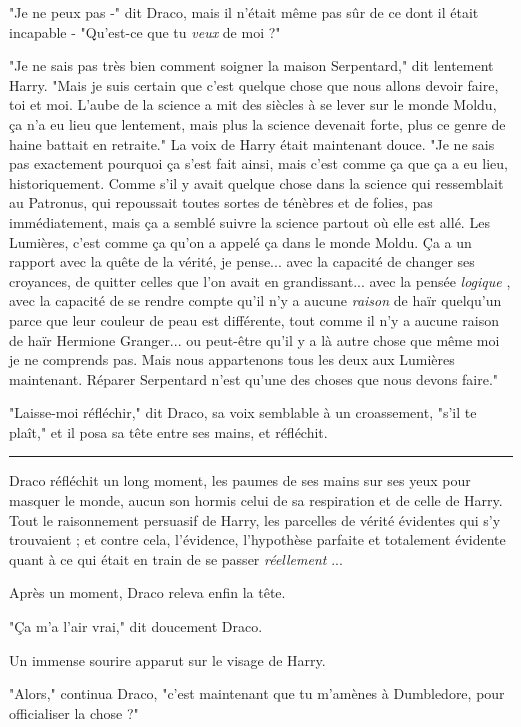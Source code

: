 "Je ne peux pas -" dit Draco, mais il n'était même pas sûr de ce dont il était incapable - "Qu'est-ce que tu \emph{veux}  de moi ?"

"Je ne sais pas très bien comment soigner la maison Serpentard," dit lentement Harry. "Mais je suis certain que c'est quelque chose que nous allons devoir faire, toi et moi. L'aube de la science a mit des siècles à se lever sur le monde Moldu, ça n'a eu lieu que lentement, mais plus la science devenait forte, plus ce genre de haine battait en retraite." La voix de Harry était maintenant douce. "Je ne sais pas exactement pourquoi ça s'est fait ainsi, mais c'est comme ça que ça a eu lieu, historiquement. Comme s'il y avait quelque chose dans la science qui ressemblait au Patronus, qui repoussait toutes sortes de ténèbres et de folies, pas immédiatement, mais ça a semblé suivre la science partout où elle est allé. Les Lumières, c'est comme ça qu'on a appelé ça dans le monde Moldu. Ça a un rapport avec la quête de la vérité, je pense... avec la capacité de changer ses croyances, de quitter celles que l'on avait en grandissant... avec la pensée \emph{logique} , avec la capacité de se rendre compte qu'il n'y a aucune \emph{raison}  de haïr quelqu'un parce que leur couleur de peau est différente, tout comme il n'y a aucune raison de haïr Hermione Granger... ou peut-être qu'il y a là autre chose que même moi je ne comprends pas. Mais nous appartenons tous les deux aux Lumières maintenant. Réparer Serpentard n'est qu'une des choses que nous devons faire."

"Laisse-moi réfléchir," dit Draco, sa voix semblable à un croassement, "s'il te plaît," et il posa sa tête entre ses mains, et réfléchit.
\par\noindent\rule{\textwidth}{0.4pt}
Draco réfléchit un long moment, les paumes de ses mains sur ses yeux pour masquer le monde, aucun son hormis celui de sa respiration et de celle de Harry. Tout le raisonnement persuasif de Harry, les parcelles de vérité évidentes qui s'y trouvaient ; et contre cela, l'évidence, l'hypothèse parfaite et totalement évidente quant à ce qui était en train de se passer \emph{réellement} ...

Après un moment, Draco releva enfin la tête.

"Ça m'a l'air vrai," dit doucement Draco.

Un immense sourire apparut sur le visage de Harry.

"Alors," continua Draco, "c'est maintenant que tu m'amènes à Dumbledore, pour officialiser la chose ?"

